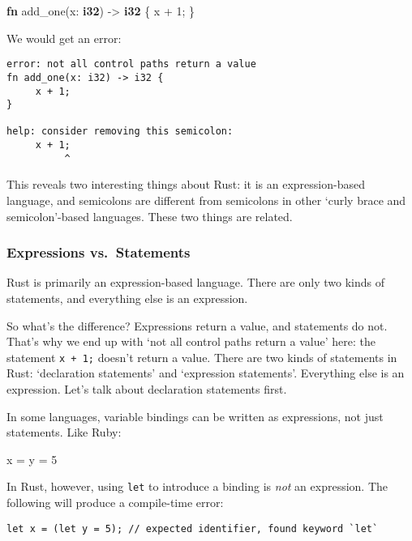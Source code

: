 \documentclass[a4paper,]{book}
\newenvironment{Shaded}{\begin{snugshade}}{\end{snugshade}}
\newcommand{\KeywordTok}[1]{\textcolor[rgb]{0.13,0.29,0.53}{\textbf{{#1}}}}
\newcommand{\DecValTok}[1]{\textcolor[rgb]{0.00,0.00,0.81}{{#1}}}
\newcommand{\NormalTok}[1]{{#1}}
\begin{document}
\begin{Shaded}
\begin{Highlighting}[]
\KeywordTok{fn} \NormalTok{add_one(x: }\KeywordTok{i32}\NormalTok{) -> }\KeywordTok{i32} \NormalTok{\{}
    \NormalTok{x + }\DecValTok{1}\NormalTok{;}
\NormalTok{\}}
\end{Highlighting}
\end{Shaded}

We would get an error:

\begin{verbatim}
error: not all control paths return a value
fn add_one(x: i32) -> i32 {
     x + 1;
}

help: consider removing this semicolon:
     x + 1;
          ^
\end{verbatim}

This reveals two interesting things about Rust: it is an
expression-based language, and semicolons are different from semicolons
in other `curly brace and semicolon'-based languages. These two things
are related.

\subsubsection{Expressions
vs.~Statements}\label{expressions-vs.statements}

Rust is primarily an expression-based language. There are only two kinds
of statements, and everything else is an expression.

So what's the difference? Expressions return a value, and statements do
not. That's why we end up with `not all control paths return a value'
here: the statement \texttt{x\ +\ 1;} doesn't return a value. There are
two kinds of statements in Rust: `declaration statements' and
`expression statements'. Everything else is an expression. Let's talk
about declaration statements first.

In some languages, variable bindings can be written as expressions, not
just statements. Like Ruby:

\begin{Shaded}
\begin{Highlighting}[]
\NormalTok{x = y = }\DecValTok{5}
\end{Highlighting}
\end{Shaded}

In Rust, however, using \texttt{let} to introduce a binding is
\emph{not} an expression. The following will produce a compile-time
error:

\begin{verbatim}
let x = (let y = 5); // expected identifier, found keyword `let`
\end{verbatim}
\end{document}
